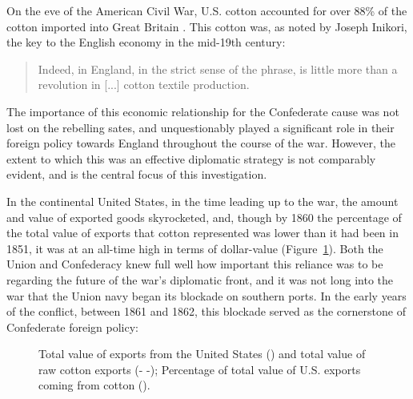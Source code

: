 
On the eve of the American Civil War, U.S. cotton accounted for over 88\% of the cotton imported into Great Britain \autocite[40]{baileyOtherSide1994}. This 
cotton was, as noted by Joseph Inikori, the key to the English economy in the mid-19th century: 
\begin{quote}
    Indeed,  in England, in the strict sense of the phrase, is little more than a revolution in [...] cotton textile production.
    \autocite[Joseph Inikori, {The Slave Trade and Revolution in Cotton Textile Production in England}, quoted in][40]{baileyOtherSide1994}
\end{quote}
The importance of this economic relationship for the Confederate cause was not lost on the rebelling sates, and unquestionably played a significant role in their 
foreign policy towards England throughout the course of the war. However, the extent to which this was an effective diplomatic strategy is not comparably evident,
and is the central focus of this investigation. 

In the continental United States, in the time leading up to the war, the amount and value of exported goods skyrocketed, and, though by 1860 the percentage of 
the total value of exports that cotton represented was lower than it had been in 1851, it was at an all-time high in terms of dollar-value (Figure~\ref{fig: B.i}).
Both the Union and Confederacy knew full well how important this reliance was to be regarding the future of the war's diplomatic front, and it was not long into the
war that the Union navy began its blockade on southern ports. In the early years of the conflict, between 1861 and 1862, this blockade served as the cornerstone of
Confederate foreign policy: 

\begin{figure}[ht]
    \centering
    
    \caption{
        Total value of exports from the United States\autocite[Table A-III]{northeconomicgrowth1966} (\textemdash) 
        and total value of raw cotton exports\autocite[Part 2, Table 2]{u.s.congressImportsduties1884} (- -);
        Percentage of total value of U.S. exports coming from cotton (\textcolor{red!75!black}{\textemdash}).
    }
    \label{fig: B.i}
\end{figure}